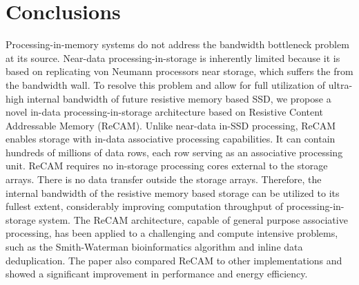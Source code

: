 \documentclass{superfri}
\begin{document}
\section{Conclusions}

Processing-in-memory systems do not address the bandwidth bottleneck problem at its source. Near-data processing-in-storage is inherently limited because it is based on replicating von Neumann processors near storage, which suffers the from the bandwidth wall. To resolve this problem and allow for full utilization of ultra-high internal bandwidth of future resistive memory based SSD, we propose a novel in-data processing-in-storage architecture based on Resistive Content Addressable Memory (ReCAM). Unlike near-data in-SSD processing, ReCAM enables storage with in-data associative processing capabilities. It can contain hundreds of millions of data rows, each row serving as an associative processing unit. ReCAM requires no in-storage processing cores external to the storage arrays. There is no data transfer outside the storage arrays. Therefore, the internal bandwidth of the resistive memory based storage can be utilized to its fullest extent, considerably improving computation throughput of processing-in-storage system.
The ReCAM architecture, capable of general purpose associative processing, has been applied to a challenging and compute intensive problems, such as the Smith-Waterman bioinformatics algorithm and inline data deduplication. The paper also compared ReCAM to other implementations and showed a significant improvement in performance and energy efficiency. 




\end{document}
